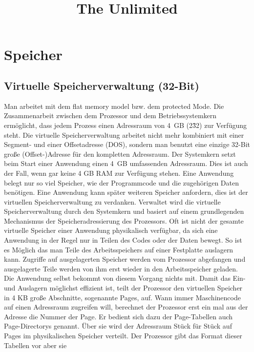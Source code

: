 \documentclass[12pt]{book}
\begin{document}
\title{The Unlimited}
\maketitle

\chapter{Speicher}

\section{Virtuelle Speicherverwaltung (32-Bit)}
Man arbeitet mit dem flat memory model bzw. dem protected Mode. Die
Zusammenarbeit zwischen dem Prozessor und dem Betriebssystemkern ermöglicht,
dass jedem Prozess einen Adressraum von 4 GB (2\^32) zur Verfügung steht. Die
virtuelle Speicherverwaltung arbeitet nicht mehr kombiniert mit einer Segment-
und einer Offsetadresse (DOS), sondern man benutzt eine einzige 32-Bit große
(Offset-)Adresse für den kompletten Adressraum. Der Systemkern setzt beim Start
einer Anwendung einen 4 GB umfassenden Adressraum. Dies ist auch der Fall, wenn
gar keine 4 GB RAM zur Verfügung stehen. Eine Anwendung belegt nur so viel
Speicher, wie der Programmcode und die zugehörigen Daten benötigen. Eine
Anwendung kann später weiteren Speicher anfordern, dies ist der virtuellen
Speicherverwaltung zu verdanken. Verwaltet wird die virtuelle Speicherverwaltung
durch den Systemkern und basiert auf einem grundlegenden Mechanismus der
Speicheradressierung des Prozessors. Oft ist nicht der gesamte virtuelle
Speicher einer Anwendung physikalisch verfügbar, da sich eine Anwendung in der
Regel nur in Teilen des Codes oder der Daten bewegt. So ist es Möglich das man
Teile des Arbeitsspeichers auf einer Festplatte auslagern kann. Zugriffe auf
ausgelagerten Speicher werden vom Prozessor abgefangen und ausgelagerte Teile
werden von ihm erst wieder in den Arbeitsspeicher geladen. Die Anwendung selbst
bekommt von diesem Vorgang nichts mit. Damit das Ein- und Auslagern möglichst
effizient ist, teilt der Prozessor den virtuellen Speicher in 4 KB große
Abschnitte, sogenannte Pages, auf. Wann immer Maschinencode auf einen Adressraum
zugreifen will, berechnet der Prozessor erst ein mal aus der Adresse die Nummer
der Page. Er bedient sich dazu der Page-Tabellen auch Page-Directorys genannt.
Über sie wird der Adressraum Stück für Stück auf Pages im physikalischen
Speicher verteilt. Der Prozessor gibt das Format dieser Tabellen vor aber sie
\end{document}
